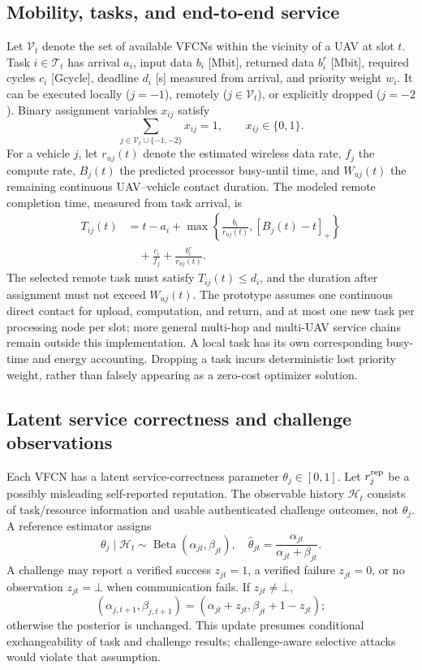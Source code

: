 \documentclass[journal]{IEEEtran}
\newcommand{\VV}{\mathcal V}
\newcommand{\TT}{\mathcal T}
\newcommand{\HH}{\mathcal H}
\begin{document}
\subsection{Mobility, tasks, and end-to-end service}
Let $\VV_t$ denote the set of available VFCNs within the vicinity of a UAV at slot $t$. Task $i\in\TT_t$ has arrival $a_i$, input data $b_i$ [Mbit], returned data $b_i^r$ [Mbit], required cycles $c_i$ [Gcycle], deadline $d_i$ [s] measured from arrival, and priority weight $w_i$. It can be executed locally ($j=-1$), remotely ($j\in\VV_t$), or explicitly dropped ($j=-2$). Binary assignment variables $x_{ij}$ satisfy
\begin{equation}\label{eq:assignment}
 \sum_{j\in\VV_t\cup\{-1,-2\}}x_{ij}=1,\qquad x_{ij}\in\{0,1\}.
\end{equation}
For a vehicle $j$, let $r_{uj}(t)$ denote the estimated wireless data rate, $f_j$ the compute rate, $B_j(t)$ the predicted processor busy-until time, and $W_{uj}(t)$ the remaining continuous UAV--vehicle contact duration. The modeled remote completion time, measured from task arrival, is
\begin{align}\label{eq:delay}
 T_{ij}(t)&=t-a_i+\max\left\{\frac{b_i}{r_{uj}(t)},[B_j(t)-t]_+\right\}\nonumber\\
 &\quad+\frac{c_i}{f_j}+\frac{b_i^r}{r_{uj}(t)}.
\end{align}
The selected remote task must satisfy $T_{ij}(t)\le d_i$, and the duration after assignment must not exceed $W_{uj}(t)$. The prototype assumes one continuous direct contact for upload, computation, and return, and at most one new task per processing node per slot; more general multi-hop and multi-UAV service chains remain outside this implementation. A local task has its own corresponding busy-time and energy accounting. Dropping a task incurs deterministic lost priority weight, rather than falsely appearing as a zero-cost optimizer solution.

\subsection{Latent service correctness and challenge observations}
Each VFCN has a latent service-correctness parameter $\theta_j\in[0,1]$. Let $r_j^{\rm rep}$ be a possibly misleading self-reported reputation. The observable history $\HH_t$ consists of task/resource information and usable authenticated challenge outcomes, not $\theta_j$. A reference estimator assigns
\begin{equation}\label{eq:beta}
 \theta_j\mid\HH_t\sim\operatorname{Beta}(\alpha_{jt},\beta_{jt}),\quad
 \widehat\theta_{jt}=\frac{\alpha_{jt}}{\alpha_{jt}+\beta_{jt}}.
\end{equation}
A challenge may report a verified success $z_{jt}=1$, a verified failure $z_{jt}=0$, or no observation $z_{jt}=\bot$ when communication fails. If $z_{jt}\ne\bot$,
\begin{equation}\label{eq:update}
 (\alpha_{j,t+1},\beta_{j,t+1})=(\alpha_{jt}+z_{jt},\beta_{jt}+1-z_{jt});
\end{equation}
otherwise the posterior is unchanged. This update presumes conditional exchangeability of task and challenge results; challenge-aware selective attacks would violate that assumption.
\end{document}
